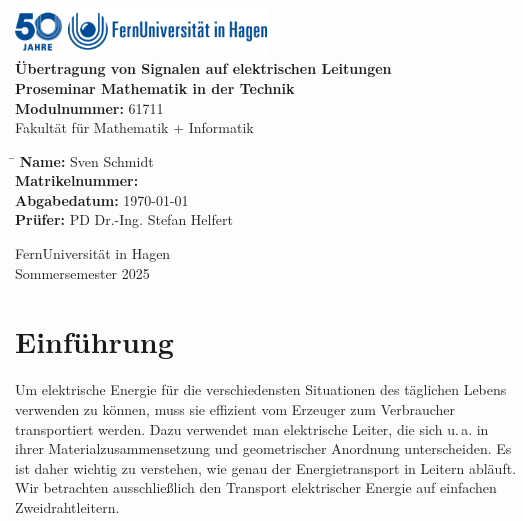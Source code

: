 \documentclass[paper=a4, parskip=half-, ngerman, fontsize=11pt]{scrreprt}
\begin{document}
\begin{titlepage}
    \begin{center}
        \includegraphics[width=0.5\textwidth]{logo_fernuni_hagen.png}\\[2cm]

        {\LARGE \textbf{Übertragung von Signalen auf elektrischen Leitungen}}\\[2cm]

        \textbf{Proseminar Mathematik in der Technik}\\
        \textbf{Modulnummer:} 61711\\
        Fakultät für Mathematik + Informatik\\[0.5cm]

        \begin{tabbing}
            \hspace{6cm} \= \kill
            \textbf{Name:} \> Sven Schmidt \\
            \textbf{Matrikelnummer:}  \\
            \textbf{Abgabedatum:} \> \today \\
            \textbf{Prüfer:} \> PD Dr.-Ing. Stefan Helfert \\
        \end{tabbing}

        \vfill

        {\large FernUniversität in Hagen}\\
        {\large Sommersemester 2025}
    \end{center}
\end{titlepage}

\chapter{Einführung}
Um elektrische Energie für die verschiedensten Situationen des täglichen Lebens verwenden zu können, muss sie effizient
vom Erzeuger zum Verbraucher transportiert werden. Dazu verwendet man elektrische Leiter, die sich u.\,a. in ihrer
Materialzusammensetzung und geometrischer Anordnung unterscheiden. Es ist daher wichtig zu verstehen, wie genau der
Energietransport in Leitern abläuft. Wir betrachten ausschließlich den Transport elektrischer Energie auf einfachen
Zweidrahtleitern.
\end{document}
